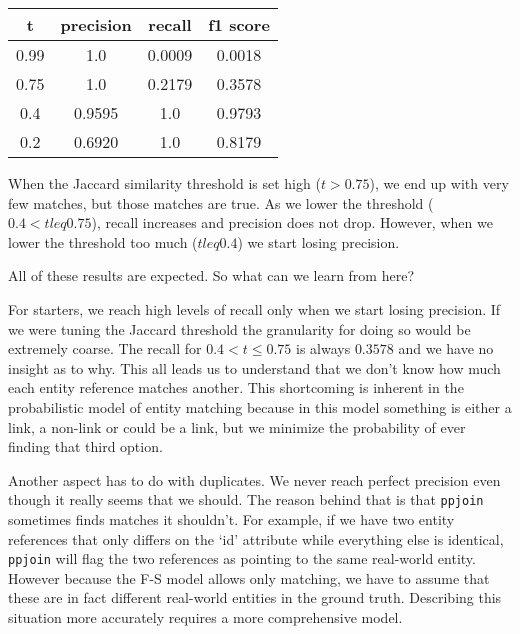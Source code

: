 \documentclass[11pt]{article}
\begin{document}
    \begin{center}
        \begin{tabular}[b]{|cccc|}
            \hline
            t & precision & recall & f1 score \\
            \hline
            0.99 & 1.0 & 0.0009 & 0.0018 \\
            0.75 & 1.0 & 0.2179 & 0.3578 \\
            0.4 & 0.9595 & 1.0 & 0.9793 \\
            0.2 & 0.6920 & 1.0 & 0.8179 \\
            \hline
        \end{tabular}
    \end{center}

    When the Jaccard similarity threshold is set high ($t > 0.75$), we end up
    with very few matches, but those matches are true.
    As we lower the threshold ($0.4 < t leq 0.75$), recall increases and
    precision does not drop.
    However, when we lower the threshold too much ($t leq 0.4$) we start losing
    precision.
    
    All of these results are expected.
    So what can we learn from here?

    For starters, we reach high levels of recall only when we start losing
    precision.
    If we were tuning the Jaccard threshold the granularity for doing so would
    be extremely coarse.
    The recall for $0.4 < t \leq 0.75$ is always $0.3578$ and we have no insight
    as to why.
    This all leads us to understand that we don't know how much each entity
    reference matches another.
    This shortcoming is inherent in the probabilistic model of entity matching
    because in this model something is either a link, a non-link or could be a
    link, but we minimize the probability of ever finding that third option.
    
    Another aspect has to do with duplicates.
    We never reach perfect precision even though it really seems that we should.
    The reason behind that is that \texttt{ppjoin} sometimes finds matches it
    shouldn't. 
    For example, if we have two entity references that only differs on the `id'
    attribute while everything else is identical, \texttt{ppjoin} will flag the
    two references as pointing to the same real-world entity.
    However because the F-S model allows only matching, we have to assume that
    these are in fact different real-world entities in the ground truth.
    Describing this situation more accurately requires a more comprehensive
    model.
\end{document}
